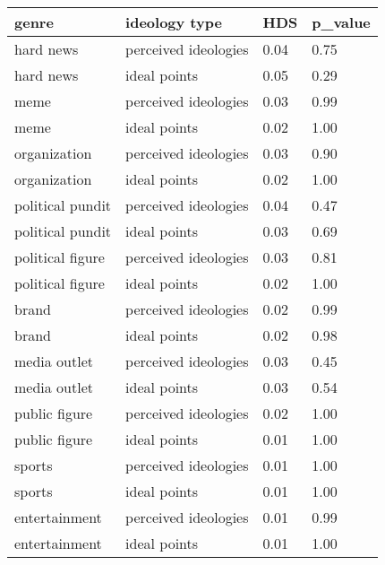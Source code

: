 \begin{table}
\centering
\begin{tabular}[t]{llll}
\toprule
genre & ideology type & HDS & p\_value\\
\midrule
hard news & perceived ideologies & 0.04 & 0.75\\
hard news & ideal points & 0.05 & 0.29\\
meme & perceived ideologies & 0.03 & 0.99\\
meme & ideal points & 0.02 & 1.00\\
organization & perceived ideologies & 0.03 & 0.90\\
organization & ideal points & 0.02 & 1.00\\
political pundit & perceived ideologies & 0.04 & 0.47\\
political pundit & ideal points & 0.03 & 0.69\\
political figure & perceived ideologies & 0.03 & 0.81\\
political figure & ideal points & 0.02 & 1.00\\
brand & perceived ideologies & 0.02 & 0.99\\
brand & ideal points & 0.02 & 0.98\\
media outlet & perceived ideologies & 0.03 & 0.45\\
media outlet & ideal points & 0.03 & 0.54\\
public figure & perceived ideologies & 0.02 & 1.00\\
public figure & ideal points & 0.01 & 1.00\\
sports & perceived ideologies & 0.01 & 1.00\\
sports & ideal points & 0.01 & 1.00\\
entertainment & perceived ideologies & 0.01 & 0.99\\
entertainment & ideal points & 0.01 & 1.00\\
\bottomrule
\end{tabular}
\end{table}
